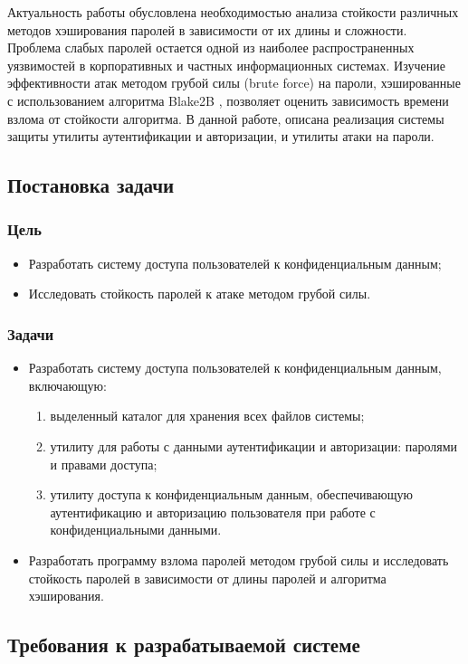 \documentclass[areasetadvanced]{scrartcl}
\begin{document}
Актуальность работы обусловлена необходимостью анализа стойкости различных методов хэширования паролей в зависимости от их длины и сложности.
Проблема слабых паролей остается одной из наиболее распространенных уязвимостей в корпоративных и частных информационных системах.
Изучение эффективности атак методом грубой силы (brute force) на пароли, хэшированные с использованием алгоритма Blake2B ,
позволяет оценить зависимость времени взлома от стойкости алгоритма. 
В данной работе, описана реализация системы защиты утилиты аутентификации и авторизации, и утилиты атаки на пароли. 

\subsection{Постановка задачи}
\subsubsection{Цель}
\begin{itemize}
    \item Разработать систему доступа пользователей к конфиденциальным данным;
    \item Исследовать стойкость паролей к атаке методом грубой силы.
\end{itemize}
\subsubsection{Задачи}
\begin{itemize}
    \item Разработать систему доступа пользователей к конфиденциальным данным, включающую: \begin{enumerate} 
        \item выделенный каталог для хранения всех файлов системы;
        \item утилиту для работы с данными аутентификации и авторизации: паролями и правами доступа;
        \item утилиту доступа к конфиденциальным данным, обеспечивающую аутентификацию и авторизацию пользователя при работе с конфиденциальными данными.
        \end{enumerate}
    \item Разработать программу взлома паролей методом грубой силы и исследовать стойкость паролей в зависимости от длины паролей и алгоритма хэширования.
\end{itemize}

\subsection{Требования к разрабатываемой системе}
\end{document}

